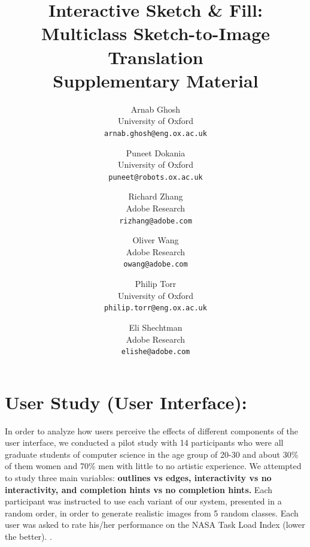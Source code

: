 \documentclass[10pt,twocolumn,letterpaper]{article}
\newcommand{\todo}[1]{\textbf{\textcolor[rgb]{.8, .1, .1}{#1}}}
\begin{document}
\title{Interactive Sketch \& Fill: Multiclass Sketch-to-Image Translation \\ Supplementary Material}

\author{Arnab Ghosh\\
University of Oxford\\
{\tt\small arnab.ghosh@eng.ox.ac.uk}
\and
Puneet Dokania\\
University of Oxford\\
{\tt\small puneet@robots.ox.ac.uk}
\and
Richard Zhang\\
Adobe Research\\
{\tt\small rizhang@adobe.com}
\and
Oliver Wang\\
Adobe Research\\
{\tt\small owang@adobe.com}
\and
Philip Torr\\
University of Oxford\\
{\tt\small philip.torr@eng.ox.ac.uk}
\and
Eli Shechtman\\
Adobe Research\\
{\tt\small elishe@adobe.com}
}

\maketitle


\section{User Study (User Interface):}
In order to analyze how users perceive the effects of different components of the user interface, we conducted a pilot study with 14 participants who were all graduate students of computer science in the age group of 20-30 and about 30\% of them women and 70\% men with little to no artistic experience. 
We attempted to study three main variables: \textbf{outlines vs edges, interactivity vs no interactivity, and completion hints vs no completion hints.} 
Each participant was instructed to use each variant of our system, presented in a random order, in order to generate realistic images from 5 random classes. 
Each user was asked to rate his/her performance on the NASA Task Load Index (lower the better). \cite{hart1988development}. 
\end{document}
